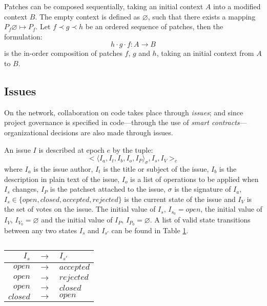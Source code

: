 Patches can be composed sequentially, taking an initial context $A$ into
a modified context $B$. The empty context is defined as $\varnothing$, such
that there exists a mapping $P_f \varnothing \mapsto P_f$. Let $f \prec g
\prec h$ be an ordered sequence of patches, then the formulation:
\[
h \cdot g \cdot f : A \to B
\]
is the in-order composition of patches $f$, $g$ and $h$, taking an initial
context from $A$ to $B$.


\subsection{Issues}

On the \oscoin{} network, collaboration on code takes place through \emph{issues};
and since project governance is specified in code---through the use of
\emph{smart contracts}---organizational decisions are also made through issues.

An issue $I$ is described at epoch $e$ by the tuple:
\[
    \big<\langle I_a, I_t, I_b, I_o, I_P \rangle_{\sigma}, I_s, I_V \big>_e
\]
where $I_a$ is the issue author, $I_t$ is the title or subject of the issue,
$I_b$ is the description in plain text of the issue, $I_o$ is a list of
operations to be applied when $I_s$ changes, $I_P$ is the patchset attached to
the issue, $\sigma$ is the signature of $I_a$, $I_s \in \{open, closed,
accepted, rejected\}$ is the current state of the issue and $I_V$ is the set of
votes on the issue. The initial value of $I_s$, $I_{s_0} = open$, the initial
value of $I_V$, $I_{V_0} = \varnothing$ and the initial value of $I_P$,
$I_{P_0} = \varnothing$.  A list of valid state transitions between any two
states $I_s$ and $I_{s'}$ can be found in Table \ref{issues-valid-transitions}.

\begin{table}[hbt]
    \caption{\label{issues-valid-transitions}}
    \begin{tabular}{rcl}
        \toprule
        $I_s$      & $\to$ & $I_{s'}$ \\
        \midrule
        $open$     & $\to$ & $accepted$ \\
        $open$     & $\to$ & $rejected$ \\
        $open$     & $\to$ & $closed$ \\
        $closed$   & $\to$ & $open$ \\
        \bottomrule
    \end{tabular}
\end{table}

